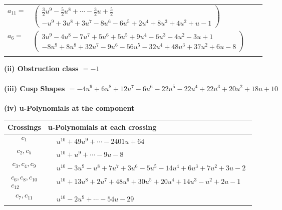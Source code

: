 \documentclass[1p]{elsarticle_modified}
\theoremstyle{definition}
\begin{document}
\begin{tabular}{m{7pt} m{180pt} m{7pt} m{180pt} }
\flushright $a_{11}=$&$\begin{pmatrix}\frac{3}{2} u^9-\frac{5}{2} u^8+\cdots-\frac{3}{2} u+\frac{5}{2}\\- u^9+3 u^8+3 u^7-8 u^6-6 u^5+2 u^4+8 u^3+4 u^2+u-1\end{pmatrix}$ \\
\flushright $a_{6}=$&$\begin{pmatrix}3 u^9-4 u^8-7 u^7+5 u^6+5 u^5+9 u^4-6 u^3-4 u^2-3 u+1\\-8 u^9+8 u^8+32 u^7-9 u^6-56 u^5-32 u^4+48 u^3+37 u^2+6 u-8\end{pmatrix}$\\&\end{tabular}
\flushleft \textbf{(ii) Obstruction class $= -1$}\\~\\
\flushleft \textbf{(iii) Cusp Shapes $= -4 u^9+6 u^8+12 u^7-6 u^6-22 u^5-22 u^4+22 u^3+20 u^2+18 u+10$}\\~\\
\newpage\renewcommand{\arraystretch}{1}
\flushleft \textbf{(iv) u-Polynomials at the component}\newline \\
\begin{tabular}{m{50pt}|m{274pt}}
Crossings & \hspace{64pt}u-Polynomials at each crossing \\
\hline $$\begin{aligned}c_{1}\end{aligned}$$&$\begin{aligned}
&u^{10}+49 u^9+\cdots-2401 u+64
\end{aligned}$\\
\hline $$\begin{aligned}c_{2},c_{5}\end{aligned}$$&$\begin{aligned}
&u^{10}+u^9+\cdots-9 u-8
\end{aligned}$\\
\hline $$\begin{aligned}c_{3},c_{4},c_{9}\end{aligned}$$&$\begin{aligned}
&u^{10}-3 u^9- u^8+7 u^7+3 u^6-5 u^5-14 u^4+6 u^3+7 u^2+3 u-2
\end{aligned}$\\
\hline $$\begin{aligned}c_{6},c_{8},c_{10}\\c_{12}\end{aligned}$$&$\begin{aligned}
&u^{10}+13 u^8+2 u^7+48 u^6+30 u^5+20 u^4+14 u^3- u^2+2 u-1
\end{aligned}$\\
\hline $$\begin{aligned}c_{7},c_{11}\end{aligned}$$&$\begin{aligned}
&u^{10}-2 u^9+\cdots-54 u-29
\end{aligned}$\\
\hline
\end{tabular}\\~\\
\end{document}
